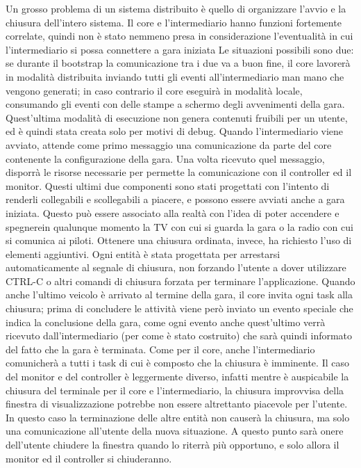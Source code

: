 Un grosso problema di un sistema distribuito è quello di organizzare l’avvio e la chiusura dell’intero sistema.
Il core e l’intermediario hanno funzioni fortemente correlate, quindi non è stato nemmeno presa in considerazione l’eventualità in cui l’intermediario si possa connettere a gara iniziata
Le situazioni possibili sono due: se durante il bootstrap la comunicazione tra i due va a buon fine, il core lavorerà in modalità distribuita inviando tutti gli eventi all’intermediario man mano che vengono generati; in caso contrario il core eseguirà in modalità locale, consumando gli eventi con delle stampe a schermo degli avvenimenti della gara. Quest’ultima modalità di esecuzione non genera contenuti fruibili per un utente, ed è quindi stata creata solo per motivi di debug.
Quando l’intermediario viene avviato, attende come primo messaggio una comunicazione da parte del core contenente la configurazione della gara. Una volta ricevuto quel messaggio, disporrà le risorse necessarie per permette la comunicazione con il controller ed il monitor.
Questi ultimi due componenti sono stati progettati con l’intento di renderli collegabili e scollegabili a piacere, e possono essere avviati anche a gara iniziata. Questo può essere associato alla realtà con l’idea di poter accendere e spegnerein qualunque momento la TV con cui si guarda la gara o la radio con cui si comunica ai piloti.
Ottenere una chiusura ordinata, invece, ha richiesto l’uso di elementi aggiuntivi. Ogni entità è stata progettata per arrestarsi automaticamente al segnale di chiusura, non forzando l’utente a dover utilizzare CTRL-C o altri comandi di chiusura forzata per terminare l’applicazione.
Quando anche l’ultimo veicolo è arrivato al termine della gara, il core invita ogni task alla chiusura; prima di concludere le attività viene però inviato un evento speciale che indica la conclusione della gara, come ogni evento anche quest’ultimo verrà ricevuto dall’intermediario (per come è stato costruito) che sarà quindi informato del fatto che la gara è terminata. Come per il core, anche l’intermediario comunicherà a tutti i task di cui è composto che la chiusura è imminente.
Il caso del monitor e del controller è leggermente diverso, infatti mentre è auspicabile la chiusura del terminale per il core e l’intermediario, la chiusura improvvisa della finestra di visualizzazione potrebbe non essere altrettanto piacevole per l’utente. In questo caso la terminazione delle altre entità non causerà la chiusura, ma solo una comunicazione all’utente della nuova situazione. A questo punto sarà onere dell’utente chiudere la finestra quando lo riterrà più opportuno, e solo allora il monitor ed il controller si chiuderanno.